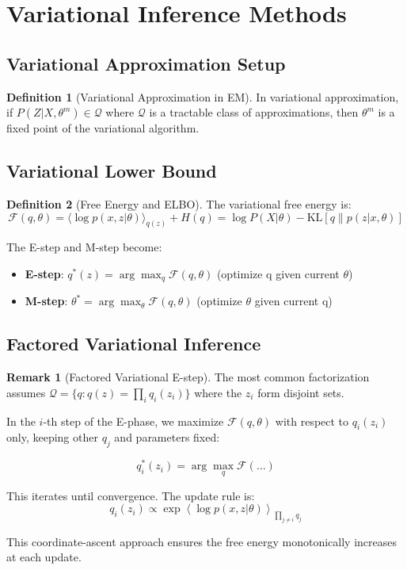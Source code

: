 \documentclass[12pt,a4paper]{article}
\theoremstyle{definition}
\newtheorem{definition}{Definition}[section]
\newtheorem{remark}{Remark}[section]
\begin{document}
\newpage

\section{Variational Inference Methods}

\subsection{Variational Approximation Setup}

\begin{definition}[Variational Approximation in EM]
In variational approximation, if $P(Z | X, \theta^m) \in \mathcal{Q}$ where $\mathcal{Q}$ is a tractable class of approximations, then $\theta^m$ is a fixed point of the variational algorithm.
\end{definition}

\subsection{Variational Lower Bound}

\begin{definition}[Free Energy and ELBO]
The variational free energy is:
\[
\mathcal{F}(q, \theta) = \langle \log p(x, z | \theta) \rangle_{q(z)} + H(q) = \log P(X | \theta) - \text{KL}[q \| p(z | x, \theta)]
\]

The E-step and M-step become:
\begin{itemize}
    \item \textbf{E-step}: $q^*(z) = \arg\max_q \mathcal{F}(q, \theta)$ (optimize q given current $\theta$)
    \item \textbf{M-step}: $\theta^* = \arg\max_\theta \mathcal{F}(q, \theta)$ (optimize $\theta$ given current q)
\end{itemize}
\end{definition}

\subsection{Factored Variational Inference}

\begin{remark}[Factored Variational E-step]
The most common factorization assumes $\mathcal{Q} = \{q : q(z) = \prod_i q_i(z_i)\}$ where the $z_i$ form disjoint sets.

In the $i$-th step of the E-phase, we maximize $\mathcal{F}(q, \theta)$ with respect to $q_i(z_i)$ only, keeping other $q_j$ and parameters fixed:

\[
q_i^*(z_i) = \arg\max_q \mathcal{F}(\ldots)
\]

This iterates until convergence. The update rule is:
\[
q_i(z_i) \propto \exp \left\langle \log p(x, z | \theta) \right\rangle_{\prod_{j \neq i} q_j}
\]

This coordinate-ascent approach ensures the free energy monotonically increases at each update.
\end{remark}
\end{document}
